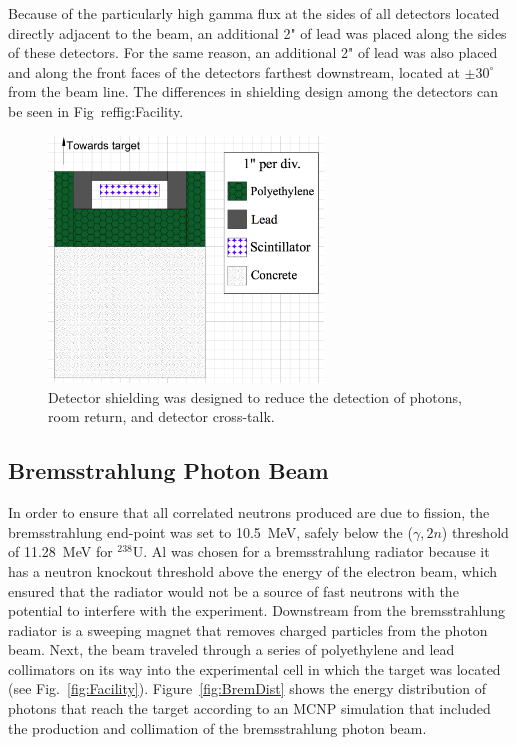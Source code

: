 Because of the particularly high gamma flux at the sides of all detectors located directly adjacent to the beam, an additional 2" of lead was placed along the sides of these detectors.
For the same reason, an additional 2" of lead was also placed and along the front faces of the detectors farthest downstream, located at $\pm30^{\circ}$ from the beam line.
The differences in shielding design among the detectors can be seen in Fig~ref{fig:Facility}.
\begin{figure}
    \centering
    \includegraphics[width = 0.65\textwidth]{Content/Methods/DetShielding.png}
    \caption{Detector shielding was designed to reduce the detection of photons, room return, and detector cross-talk.}
    \label{fig:shielding}
\end{figure}

\subsection{Bremsstrahlung Photon Beam}
\label{beam}
In order to ensure that all correlated neutrons produced are due to fission, the bremsstrahlung end-point was set to 10.5~MeV, safely below the ($\gamma, 2n$) threshold of 11.28~MeV for $^{238}$U.
Al was chosen for a bremsstrahlung radiator because it has a neutron knockout threshold above the energy of the electron beam, which ensured that the radiator would not be a source of fast neutrons with the potential to interfere with the experiment.
Downstream from the bremsstrahlung radiator is a sweeping magnet that removes charged particles from the photon beam.
Next, the beam traveled through a series of polyethylene and lead collimators on its way into the experimental cell in which the target was located (see Fig.~\ref{fig:Facility}).
Figure~\ref{fig:BremDist} shows the energy distribution of photons that reach the target according to an MCNP simulation that included the production and collimation of the bremsstrahlung photon beam.

